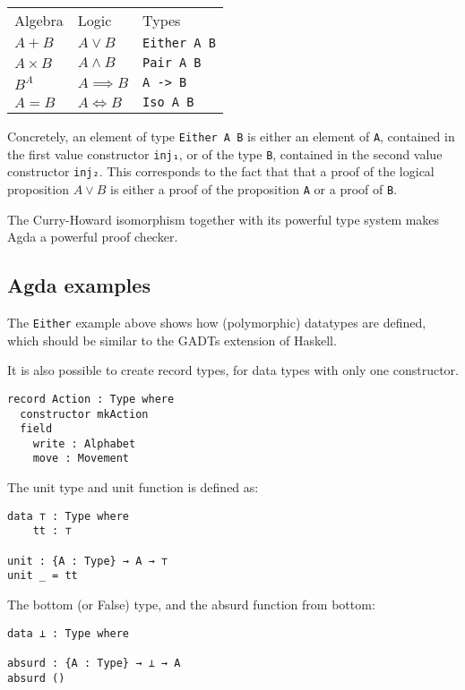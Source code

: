 \begin{table}[]
\begin{tabular}{lll}
Algebra      & Logic                   & Types \\
$A + B$      & $A \vee B$              & \texttt{Either A B} \\
$A \times B$ & $A \wedge B$            & \texttt{Pair A B}\\
$B^A$        & $ A \implies B$         & \texttt{A -> B} \\
$A = B$      & $ A \iff B$             & \texttt{Iso A B}
\end{tabular}
\end{table}

Concretely, an element of type \texttt{Either A B} is either an element of \texttt{A}, contained in the first value constructor \texttt{inj₁}, or of the type \texttt{B}, contained in the second value constructor \texttt{inj₂}. This corresponds to the fact that that a proof of the logical proposition $A \vee B$ is either a proof of the proposition \texttt{A} or a proof of \texttt{B}.

The Curry-Howard isomorphism together with its powerful type system makes Agda a powerful proof checker.


\subsection{Agda examples}
The \texttt{Either} example above shows how (polymorphic) datatypes are defined, which should be similar to the GADTs \cite{haskellGADT} extension of Haskell.

It is also possible to create record types, for data types with only one constructor.

\begin{verbatim}
record Action : Type where
  constructor mkAction
  field
    write : Alphabet
    move : Movement
\end{verbatim}

The unit type and unit function is defined as:
\begin{verbatim}
data ⊤ : Type where
    tt : ⊤

unit : {A : Type} → A → ⊤
unit _ = tt
\end{verbatim}

The bottom (or False) type, and the absurd function from bottom:
\begin{verbatim}
data ⊥ : Type where

absurd : {A : Type} → ⊥ → A
absurd ()
\end{verbatim}

